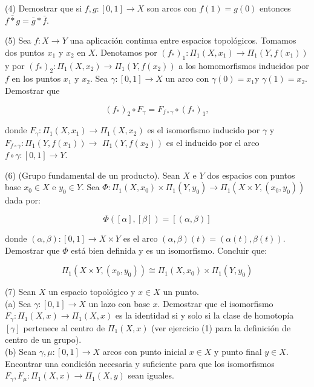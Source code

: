 \documentclass[
  a4paper,
  spanish,
  12pt,
]{scrartcl}
\begin{document}
\begin{ejer}
(4) Demostrar que si $f, g:[0,1] \rightarrow X$ son arcos con $f(1)=g(0)$ entonces $\overline{f * g}=\bar{g} * \bar{f}$.\\
\end{ejer}


\begin{ejer}
(5) Sea $f: X \rightarrow Y$ una aplicación continua entre espacios topológicos. Tomamos dos puntos $x_{1}$ y $x_{2}$ en $X$. Denotamos por $\left(f_{*}\right)_{1}: \Pi_{1}\left(X, x_{1}\right) \rightarrow \Pi_{1}\left(Y, f\left(x_{1}\right)\right)$ y por $\left(f_{*}\right)_{2}: \Pi_{1}\left(X, x_{2}\right) \rightarrow \Pi_{1}\left(Y, f\left(x_{2}\right)\right)$ a los homomorfismos inducidos por $f$ en los puntos $x_{1}$ y $x_{2}$. Sea $\gamma:[0,1] \rightarrow X$ un arco con $\gamma(0)=x_{1} \mathrm{y}$ $\gamma(1)=x_{2}$. Demostrar que

$$
\left(f_{*}\right)_{2} \circ F_{\gamma}=F_{f \circ \gamma} \circ\left(f_{*}\right)_{1},
$$

donde $F_{\gamma}: \Pi_{1}\left(X, x_{1}\right) \rightarrow \Pi_{1}\left(X, x_{2}\right)$ es el isomorfismo inducido por $\gamma$ y $F_{f \circ \gamma}: \Pi_{1}\left(Y, f\left(x_{1}\right)\right) \rightarrow$ $\Pi_{1}\left(Y, f\left(x_{2}\right)\right)$ es el inducido por el arco $f \circ \gamma:[0,1] \rightarrow Y$.\\
\end{ejer}

\begin{ejer}
(6) (Grupo fundamental de un producto). Sean $X$ e $Y$ dos espacios con puntos base $x_{0} \in X$ e $y_{0} \in Y$. Sea $\Phi: \Pi_{1}\left(X, x_{0}\right) \times \Pi_{1}\left(Y, y_{0}\right) \rightarrow \Pi_{1}\left(X \times Y,\left(x_{0}, y_{0}\right)\right)$ dada por:


$$
\Phi([\alpha],[\beta])=[(\alpha, \beta)]
$$

donde $(\alpha, \beta):[0,1] \rightarrow X \times Y$ es el arco $(\alpha, \beta)(t)=(\alpha(t), \beta(t))$. Demostrar que $\Phi$ está bien definida y es un isomorfismo. Concluir que:

$$
\Pi_{1}\left(X \times Y,\left(x_{0}, y_{0}\right)\right) \cong \Pi_{1}\left(X, x_{0}\right) \times \Pi_{1}\left(Y, y_{0}\right)
$$
\end{ejer}


\begin{ejer}
(7) Sean $X$ un espacio topológico y $x \in X$ un punto.\\
(a) Sea $\gamma:[0,1] \rightarrow X$ un lazo con base $x$. Demostrar que el isomorfismo $F_{\gamma}: \Pi_{1}(X, x) \rightarrow \Pi_{1}(X, x)$ es la identidad si y solo si la clase de homotopía $[\gamma]$ pertenece al centro de $\Pi_{1}(X, x)$ (ver ejercicio (1) para la definición de centro de un grupo).\\
(b) Sean $\gamma, \mu:[0,1] \rightarrow X$ arcos con punto inicial $x \in X$ y punto final $y \in X$. Encontrar una condición necesaria y suficiente para que los isomorfismos $F_{\gamma}, F_{\mu}: \Pi_{1}(X, x) \rightarrow \Pi_{1}(X, y)$ sean iguales.\\
\end{ejer}
\end{document}
